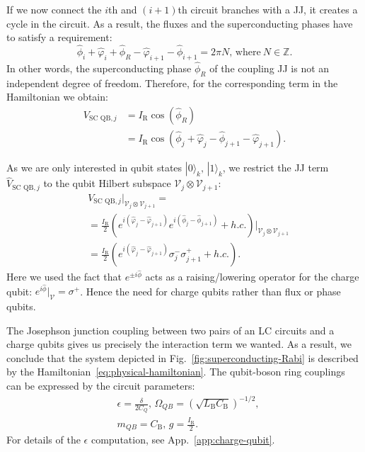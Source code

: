 \documentclass[reprint, aps, prx, amsmath, amssymb, longbibliography, superscriptaddress]{revtex4-2}
\begin{document}
If we now connect the $i$th and $(i+1)$th circuit branches with a JJ, it creates a cycle in the circuit. As a result, the fluxes and the superconducting phases have to satisfy a requirement:
\begin{equation}
  \hat \phi_i + \hat\varphi_i + \hat\phi_R - \hat\varphi_{i+1} - \hat\phi_{i+1} = 2\pi N, \, \text{where}\ N \in \mathbb{Z}.
\end{equation}
In other words, the superconducting phase $\hat \phi_R$ of the coupling JJ is not an independent degree of freedom. Therefore, for the corresponding term in the Hamiltonian we obtain:
\begin{equation}
\begin{aligned}
    V_{\text{SC QB},j} &= I_{\text{R}} \cos(\hat \phi_R) \\
    &=  I_{\text{R}}\cos(\hat \phi_j + \hat \varphi_j - \hat \phi_{j+1} - \hat \varphi_{j+1}).
\end{aligned}
\end{equation}


As we are only interested in qubit states $|0\rangle_k,\, |1\rangle_k$, we restrict the JJ term $\hat V_{\text{SC QB},j}$ to the qubit Hilbert subspace $\mathcal{V}_j\otimes \mathcal{V}_{j+1}$:
\begin{equation}
\begin{aligned}
    &V_{\text{SC QB},j} \bigg |_{\mathcal{V}_j\otimes \mathcal{V}_{j+1}} = \\
    &=\frac{I_{\text{R}}}{2}\left(e^{i(\hat\varphi_j - \hat\varphi_{j+1})} e^{i(\hat\phi_j - \hat\phi_{j+1})} + h.c. \right) \bigg|_{\mathcal{V}_j\otimes \mathcal{V}_{j+1}} \\
    &=\frac{I_{\text{R}}}{2}\left(e^{i(\hat\varphi_j - \hat\varphi_{j+1})} \sigma_j^- \sigma_{j+1}^+ + h.c. \right).
\end{aligned}
\end{equation}
Here we used the fact that $e^{\pm i\hat\phi}$ acts as a raising/lowering operator for the charge qubit: $e^{i\hat\phi}|_{\mathcal{V}} = \sigma^+$. Hence the need for charge qubits rather than flux or phase qubits.

The Josephson junction coupling between two pairs of an LC circuits and a charge qubits gives us precisely the interaction term we wanted. As a result, we conclude that the system depicted in Fig.~\ref{fig:superconducting-Rabi} is described by the Hamiltonian~\eqref{eq:physical-hamiltonian}.  The qubit-boson ring couplings can be expressed by the circuit parameters:
\begin{equation}
\begin{aligned}
    &\epsilon = \frac{\delta}{2 C_Q},\,
    \Omega_{QB} = \left(\sqrt{L_{\text{B}}C_{\text{B}}}\right)^{-1/2}, \\
    &m_{QB} = C_{\text{B}}, \, g = \frac{I_{\text{R}}}{2}.
\end{aligned}
\end{equation}
For details of the $\epsilon$ computation, see App.~\ref{app:charge-qubit}. 
\end{document}
